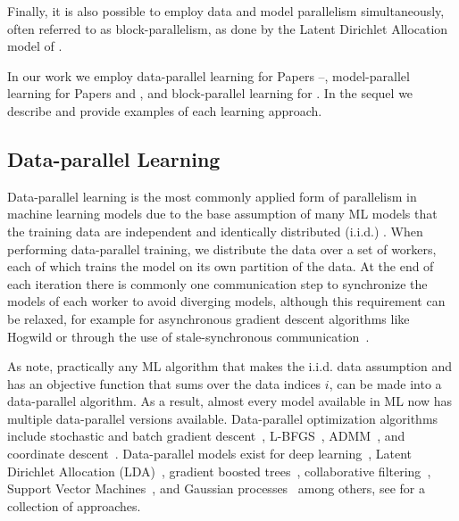 Finally, it is also possible to employ data and model parallelism simultaneously,
often referred to as block-parallelism, as done by the Latent Dirichlet Allocation
model of \cite{petuum}.

In our work we employ data-parallel learning for Papers \conceptsicdmNum--\sessionlengthNum,
model-parallel learning for Papers \boostvhtNum and \uncertaintreesNum, and
block-parallel learning for \blockgbt. In the sequel we describe and provide
examples of each learning approach.

\subsection*{Data-parallel Learning}
\label{sec:bg-data-parallel}

Data-parallel learning is the most commonly applied form of parallelism
in machine learning models due to the base assumption of many ML models
that the training data are independent and identically distributed (i.i.d.)
\cite{distributed-ml-design}. When performing data-parallel training, we
distribute the data over a set of workers, each of which trains the model
on its own partition of the data. At the end of each iteration there is commonly one communication step
to synchronize the models of each worker to avoid diverging models, although
this requirement can be relaxed, for example for asynchronous gradient descent
algorithms like Hogwild \cite{hogwild} or through the use of stale-synchronous
communication~\cite{stale-sync-ps}.

As \citet{distributed-ml-design} note, practically any ML algorithm that makes
the i.i.d. data assumption and has an objective function that sums over
the data indices $i$, can be made into a data-parallel algorithm. As a result,
almost every model available in ML now has multiple data-parallel versions
available. Data-parallel optimization algorithms include stochastic and batch gradient
descent~\cite{dekel-optimal-distributed, parallel-sgd}, L-BFGS~\cite{lbfgs-large-scale, vw},
ADMM~\cite{admm, admm-async}, and coordinate descent~\cite{rendle-distributed-cd, parallel-cd}.
Data-parallel models exist for deep learning~\cite{large-scale-dl}, Latent Dirichlet Allocation (LDA)~\cite{parallel-lda},
gradient boosted trees~\cite{xgboost, lightgbm}, collaborative filtering~\cite{koren-cf, parallel-cf}, Support Vector Machines~\cite{parallel-svm, psvm, parallel-svm-survey}, and Gaussian processes~\cite{gp-big-data, gp-distributed} among others,
see \cite{parallel-ml-book} for a collection of approaches.


